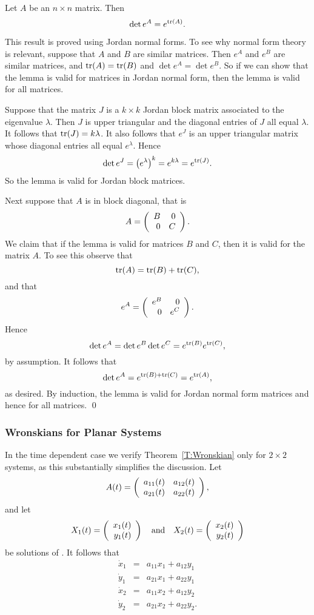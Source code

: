 \documentclass{ximera}
\begin{document}
\begin{lemma} 
Let $A$ be an $n\times n$ matrix.  Then
\[
\det e^A = e^{{\rm tr}(A)}.
\]
\end{lemma}

\proof  This result is proved using 
Jordan normal forms.  To see why normal
form theory is relevant, suppose that $A$ and $B$ are similar matrices.  Then 
$e^A$ and $e^B$ are similar matrices, and ${\rm tr}(A)={\rm tr}(B)$ and 
$\det e^A = \det e^B$.  So if we can show that the lemma is valid for matrices 
in Jordan normal form, then the lemma is valid for all matrices.

Suppose that the matrix $J$ is  a $k\times k$ 
Jordan block matrix associated
to the eigenvalue $\lambda$.  Then $J$ is upper triangular and the 
diagonal entries of $J$ all equal $\lambda$.  
It follows that ${\rm tr}(J)=k\lambda$.
It also follows that $e^J$ is an upper triangular matrix whose diagonal 
entries all equal $e^\lambda$.  Hence
\[
\det e^J = \left(e^\lambda\right)^k = e^{k\lambda} = e^{{\rm tr}(J)}.
\]
So the lemma is valid for Jordan block matrices.

Next suppose that $A$ is in block diagonal, 
that is
\[
A=\left(\begin{array}{rr} B & 0\\ 0 &C\end{array}\right).
\]
We claim that if the lemma is valid for matrices $B$ and $C$, then it 
is valid for the matrix $A$.  To see this observe that 
\[
{\rm tr}(A) = {\rm tr}(B) + {\rm tr}(C),
\]
and that 
\[
e^A = \left(\begin{array}{rr} e^B & 0\\ 0 &e^C\end{array}\right).
\]
Hence 
\[
\det e^A = \det e^B \det e^C = e^{{\rm tr}(B)}e^{{\rm tr}(C)}, 
\]
by assumption.  It follows that 
\[
\det e^A = e^{{\rm tr}(B)+{\rm tr}(C)} = e^{{\rm tr}(A)},
\]
as desired.  By induction,  the lemma is valid for Jordan normal form 
matrices and hence for all matrices.  \qed

\subsubsection*{Wronskians for Planar Systems}

In the time dependent case we verify Theorem~\ref{T:Wronskian} only 
for $2\times 2$ systems, as this 
substantially simplifies the discussion.   Let 
\[
A(t) = \left(\begin{array}{rr} a_{11}(t) & a_{12}(t)\\ a_{21}(t) &a_{22}(t)\end{array}\right),
\]
and let 
\[
X_1(t) = \left(\begin{array}{r} x_1(t) \\ y_1(t)\end{array}\right) \quad\mbox{and}\quad  X_2(t) = \left(\begin{array}{r} x_2(t) \\ y_2(t)\end{array}\right)
\]
be solutions of .  It follows that 
\begin{equation}   \label{E:xyderiv}
\begin{array}{rcl}
\dot{x}_1 & = & a_{11}x_1 + a_{12}y_1 \\
\dot{y}_1 & = & a_{21}x_1 + a_{22}y_1 \\
\dot{x}_2 & = & a_{11}x_2 + a_{12}y_2 \\
\dot{y}_2 & = & a_{21}x_2 + a_{22}y_2.
\end{array}
\end{equation}
\end{document}
